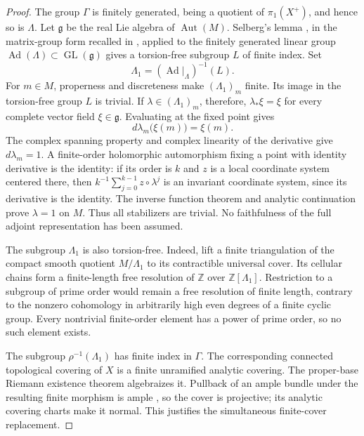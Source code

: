 \begin{proof}
The group $\Gamma$ is finitely generated, being a quotient of
$\pi_1(X^+)$, and hence so is $\Lambda$.
Let $\mathfrak g$ be the real Lie algebra of $\operatorname{Aut}(M)$.
Selberg's lemma \cite[Lemma~8]{Selberg1960}, in the matrix-group
form recalled in \cite[p.~435]{Wolf1968}, applied to the finitely
generated linear group
$\operatorname{Ad}(\Lambda)\subset\operatorname{GL}(\mathfrak g)$
gives a torsion-free subgroup $L$ of finite index.  Set
\[
 \Lambda_1=(\operatorname{Ad}|_\Lambda)^{-1}(L).
\]
For $m\in M$, properness and discreteness make $(\Lambda_1)_m$ finite.
Its image in the torsion-free group $L$ is trivial.
If $\lambda\in(\Lambda_1)_m$, therefore, $\lambda_*\xi=\xi$ for every
complete vector field $\xi\in\mathfrak g$.  Evaluating at the fixed
point gives
\[
 d\lambda_m\bigl(\xi(m)\bigr)=\xi(m).
\]
The complex spanning property and complex linearity of the derivative
give $d\lambda_m=1$.  A finite-order holomorphic automorphism fixing a
point with identity derivative is the identity: if its order is $k$
and $z$ is a local coordinate system centered there, then
$k^{-1}\sum_{j=0}^{k-1}z\circ\lambda^j$ is an invariant coordinate
system, since its derivative is the identity.  The inverse function
theorem and analytic continuation prove $\lambda=1$ on $M$.
Thus all stabilizers are trivial.  No faithfulness of the full adjoint
representation has been assumed.

The subgroup $\Lambda_1$ is also torsion-free.  Indeed, lift a finite
triangulation of the compact smooth quotient $M/\Lambda_1$ to its
contractible universal cover.  Its cellular chains form a finite-length
free resolution of $\mathbb Z$ over $\mathbb Z[\Lambda_1]$.  Restriction
to a subgroup of prime order would remain a free resolution of finite
length, contrary to the nonzero cohomology in arbitrarily high even
degrees of a finite cyclic group.  Every nontrivial finite-order element
has a power of prime order, so no such element exists.

The subgroup $\rho^{-1}(\Lambda_1)$ has finite index in $\Gamma$.
The corresponding connected topological covering of $X$ is a finite
unramified analytic covering. The proper-base Riemann existence
theorem \cite[XII, Corollary~4.6]{SGA1} algebraizes it. Pullback
of an ample bundle under the resulting finite morphism is ample
\cite[Tag~0B5V]{StacksProject}, so the cover is projective;
its analytic covering charts make it normal.  This justifies the simultaneous finite-cover replacement.
\end{proof}

